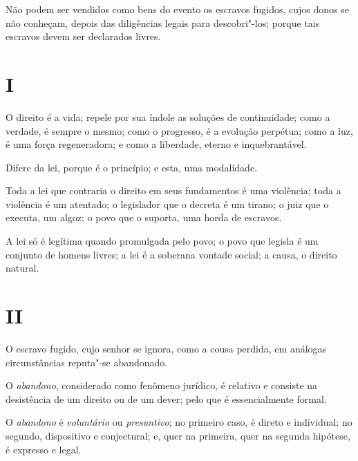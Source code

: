 Não podem ser vendidos como bens do evento os escravos fugidos, cujos
donos se não conheçam, depois das diligências legais para descobri"-los;
porque tais escravos devem ser declarados livres.


\section*{I}


O direito é a vida; repele por sua índole as soluções de continuidade;
como a verdade, é sempre o mesmo; como o progresso, é a evolução
perpétua; como a luz, é uma força regeneradora; e como a liberdade,
eterno e inquebrantável.

Difere da lei, porque é o princípio; e esta, uma modalidade.

Toda a lei que contraria o direito em seus fundamentos é uma violência;
toda a violência é um atentado; o legislador que o decreta é um tirano;
o juiz que o executa, um algoz; o povo que o suporta, uma horda de
escravos.

A lei só é legítima quando promulgada pelo povo; o povo que legisla é um
conjunto de homens livres; a lei é a soberana vontade social; a causa, o
direito natural.

\section*{II}

O escravo fugido, cujo senhor se ignora, como a cousa perdida, em
análogas circunstâncias reputa"-se abandonado.

O \emph{abandono}, considerado como fenômeno jurídico, é relativo e
consiste na desistência de um direito ou de um dever; pelo que é
essencialmente formal.

O \emph{abandono} é \emph{voluntário} ou \emph{presuntivo}; no primeiro
caso, é direto e individual; no segundo, dispositivo e conjectural; e,
quer na primeira, quer na segunda hipótese, é expresso e legal.

